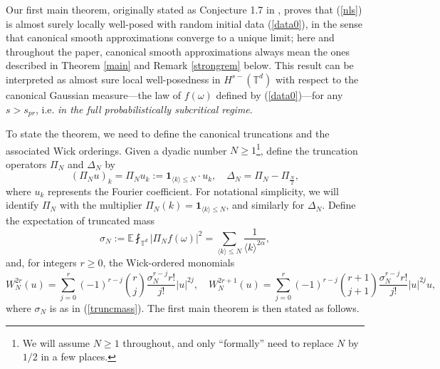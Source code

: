 \documentclass[11 pt,reqno]{amsart}
\theoremstyle{definition}
\theoremstyle{remark}
\numberwithin{equation}{section}
\newcommand{\Tb}{\mathbb{T}}
\newcommand{\Eb}{\mathbb{E}}
\begin{document}
Our first main theorem, originally stated as Conjecture 1.7 in \cite{DNY}, proves that (\ref{nls}) is almost surely locally well-posed with random initial data (\ref{data0}), in the sense that canonical smooth approximations converge to a unique limit; here and throughout the paper, canonical smooth approximations always mean the ones described in Theorem \ref{main} and Remark \ref{strongrem} below. This result can be interpreted as almost sure local well-posedness in $H^{s-}(\Tb^d)$ with respect to the canonical Gaussian measure---the law of $f(\omega)$ defined by (\ref{data0})---for any $s>s_{pr}$, i.e. \emph{in the full probabilistically subcritical regime}.

To state the theorem, we need to define the canonical truncations and the associated Wick orderings. Given a dyadic number $N\geq 1$\footnote{We will assume $N\geq 1$ throughout, and only ``formally'' need to replace $N$ by $1/2$ in a few places.}, define the truncation operators $\Pi_N$ and $\Delta_N$ by
\begin{equation}\label{proj}(\Pi_Nu)_k=\Pi_Nu_k:=\mathbf{1}_{\langle k\rangle\leq N}\cdot u_k,\quad\Delta_N=\Pi_N-\Pi_{\frac{N}{2}},\end{equation} where $u_k$ represents the Fourier coefficient. For notational simplicity, we will identify $\Pi_N$ with the multiplier $\Pi_N(k)=\mathbf{1}_{\langle k\rangle\leq N}$, and similarly for $\Delta_N$. Define the expectation of truncated mass
\begin{equation}\label{truncmass}\sigma_N:=\Eb\fint_{\Tb^d}|\Pi_Nf(\omega)|^2=\sum_{\langle k\rangle\leq N}\frac{1}{\langle k\rangle^{2\alpha}},
\end{equation} and, for integers $r\geq 0$, the Wick-ordered monomials
\begin{equation}\label{wickpoly}
W_N^{2r}(u)=\sum_{j=0}^r(-1)^{r-j}{r\choose j}\frac{\sigma_N^{r-j}r!}{j!}|u|^{2j},\quad
W_N^{2r+1}(u)=\sum_{j=0}^r(-1)^{r-j}{{r+1}\choose {j+1}}\frac{\sigma_N^{r-j}r!}{j!}|u|^{2j}u,
\end{equation} where $\sigma_N$ is as in (\ref{truncmass}). The first main theorem is then stated as follows.
\end{document}
